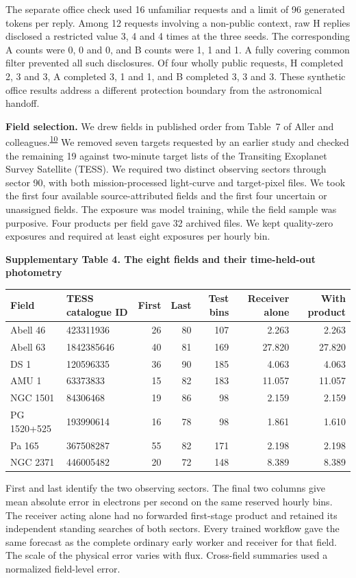 \documentclass[11pt,a4paper]{article}
\newcommand{\lead}[1]{\textbf{#1}\enspace}
\newcommand{\articlecite}[2]{\textsuperscript{\href{#2}{#1}}}
\newcommand{\tabhead}[2]{\par\Needspace{11\baselineskip}\smallskip\noindent\textbf{Supplementary Table #1. #2}\par\nobreak\smallskip}
\begin{document}
The separate office check used 16 unfamiliar requests and a limit of 96 generated tokens per reply. Among 12 requests involving a non-public context, raw H replies disclosed a restricted value 3, 4 and 4 times at the three seeds. The corresponding A counts were 0, 0 and 0, and B counts were 1, 1 and 1. A fully covering common filter prevented all such disclosures. Of four wholly public requests, H completed 2, 3 and 3, A completed 3, 1 and 1, and B completed 3, 3 and 3. These synthetic office results address a different protection boundary from the astronomical handoff.

\lead{Field selection.} We drew fields in published order from Table~7 of Aller and colleagues.\articlecite{10}{https://doi.org/10.1051/0004-6361/202450942} We removed seven targets requested by an earlier study and checked the remaining 19 against two-minute target lists of the Transiting Exoplanet Survey Satellite (TESS). We required two distinct observing sectors through sector 90, with both mission-processed light-curve and target-pixel files. We took the first four available source-attributed fields and the first four uncertain or unassigned fields. The exposure was model training, while the field sample was purposive. Four products per field gave 32 archived files. We kept quality-zero exposures and required at least eight exposures per hourly bin.

\tabhead{4}{The eight fields and their time-held-out photometry}
\begin{center}\small
\begin{tabular}{@{}llrrrrr@{}}
\toprule
Field & TESS catalogue ID & First & Last & Test bins & Receiver alone & With product\\
\midrule
Abell 46     & 423311936  & 26 & 80 & 107 & 2.263 & 2.263\\
Abell 63     & 1842385646 & 40 & 81 & 169 & 27.820 & 27.820\\
DS 1         & 120596335  & 36 & 90 & 185 & 4.063 & 4.063\\
AMU 1        & 63373833   & 15 & 82 & 183 & 11.057 & 11.057\\
NGC 1501     & 84306468   & 19 & 86 & 98  & 2.159 & 2.159\\
PG 1520+525  & 193990614  & 16 & 78 & 98  & 1.861 & 1.610\\
Pa 165       & 367508287  & 55 & 82 & 171 & 2.198 & 2.198\\
NGC 2371     & 446005482  & 20 & 72 & 148 & 8.389 & 8.389\\
\bottomrule
\end{tabular}
\end{center}
First and last identify the two observing sectors. The final two columns give mean absolute error in electrons per second on the same reserved hourly bins. The receiver acting alone had no forwarded first-stage product and retained its independent standing searches of both sectors. Every trained workflow gave the same forecast as the complete ordinary early worker and receiver for that field. The scale of the physical error varies with flux. Cross-field summaries used a normalized field-level error.
\end{document}
